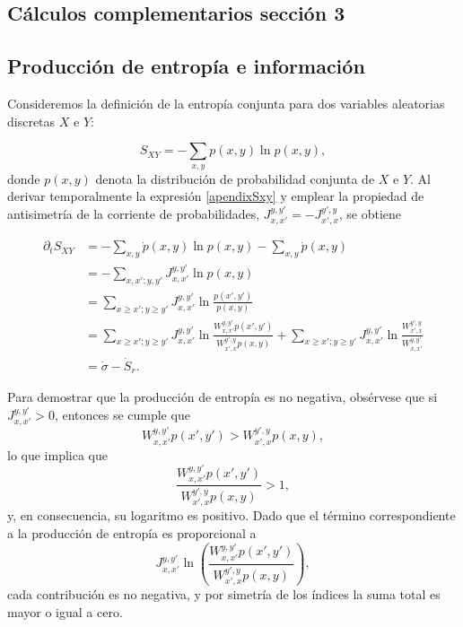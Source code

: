 \begin{appendixs}
\newpage 

    \section{Cálculos complementarios sección 3}
    \subsection{Producción de entropía e información}

Consideremos la definición de la entropía conjunta para dos variables aleatorias discretas \(X\) e \(Y\):

\begin{equation}
    S_{XY} = - \sum_{x,y} p(x,y) \ln p(x,y),
    \label{apendixSxy}
\end{equation}
donde \(p(x,y)\) denota la distribución de probabilidad conjunta de \(X\) e \(Y\).  
Al derivar temporalmente la expresión \eqref{apendixSxy} y emplear la propiedad de antisimetría de la corriente de probabilidades, \(J_{x,x'}^{y,y'} = - J_{x',x}^{y',y}\), se obtiene

\begin{align*}
    \partial_{t}S_{XY} 
    &= - \sum_{x,y} \dot{p}(x,y) \ln p(x,y) - \sum_{x,y} \dot{p}(x,y) \\
    &= - \sum_{x,x';y,y'} J_{x,x'}^{y,y'} \ln p(x,y)  \\
    &= \sum_{x \geq x'; y\geq y'} J_{x,x'}^{y,y'} \ln \frac{p(x',y')}{p(x,y)} \\
    &= \sum_{x \geq x'; y\geq y'} J_{x,x'}^{y,y'} \ln \frac{W_{x,x'}^{y,y'} p(x',y')}{W_{x',x}^{y',y} p(x,y)} 
     +  \sum_{x \geq x'; y\geq y'} J_{x,x'}^{y,y'} \ln \frac{W_{x',x}^{y',y}}{W_{x,x'}^{y,y'}} \\
    &= \dot{\sigma} - \dot{S}_{r}.
\end{align*}

Para demostrar que la producción de entropía es no negativa, obsérvese que si \(J_{x,x'}^{y,y'} > 0\), entonces se cumple que
\[
W_{x,x'}^{y,y'} p(x',y') > W_{x',x}^{y',y} p(x,y),
\]
lo que implica que
\[
\frac{W_{x,x'}^{y,y'} p(x',y')}{W_{x',x}^{y',y} p(x,y)} > 1,
\]
y, en consecuencia, su logaritmo es positivo. Dado que el término correspondiente a la producción de entropía es proporcional a 
\[
J_{x,x'}^{y,y'} \ln \left( \frac{W_{x,x'}^{y,y'} p(x',y')}{W_{x',x}^{y',y} p(x,y)} \right),
\]
cada contribución es no negativa, y por simetría de los índices la suma total es mayor o igual a cero.
\\


\end{appendixs}
